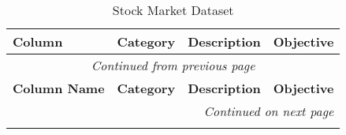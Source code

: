 \begin{longtable}{llp{5cm}p{5cm}}
    \caption{Stock Market Dataset}\label{tab:dataset_structure} \\
    \hline
    \textbf{Column} & \textbf{Category} & \textbf{Description} & \textbf{Objective}  \\
    \hline\hline
    \endfirsthead

    \multicolumn{4}{c}{\textit{Continued from previous page}} \\
    \hline
    \textbf{Column Name} & \textbf{Category} & \textbf{Description} & \textbf{Objective} \\
    \hline\hline
    \endhead

    \hline \multicolumn{4}{r}{\textit{Continued on next page}} \\
    \endfoot


\end{longtable}
